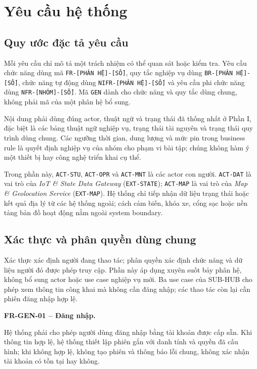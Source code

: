 \clearpage
\section{Yêu cầu hệ thống}

\subsection{Quy ước đặc tả yêu cầu}

Mỗi yêu cầu chỉ mô tả một trách nhiệm có thể quan sát hoặc kiểm tra. Yêu cầu chức năng dùng mã \texttt{FR-[PHÂN HỆ]-[SỐ]}, quy tắc nghiệp vụ dùng \texttt{BR-[PHÂN HỆ]-[SỐ]}, chức năng tự động dùng \texttt{NIFR-[PHÂN HỆ]-[SỐ]} và yêu cầu phi chức năng dùng \texttt{NFR-[NHÓM]-[SỐ]}. Mã \texttt{GEN} dành cho chức năng và quy tắc dùng chung, không phải mã của một phân hệ bổ sung.

Nội dung phải dùng đúng actor, thuật ngữ và trạng thái đã thống nhất ở Phần I, đặc biệt là các bảng thuật ngữ nghiệp vụ, trạng thái tài nguyên và trạng thái quy trình dùng chung. Các ngưỡng thời gian, dung lượng và mức pin trong business rule là quyết định nghiệp vụ của nhóm cho phạm vi bài tập; chúng không hàm ý một thiết bị hay công nghệ triển khai cụ thể.

Trong phần này, \texttt{ACT-STU}, \texttt{ACT-OPR} và \texttt{ACT-MNT} là các actor con người. \texttt{ACT-DAT} là vai trò của \textit{IoT \& State Data Gateway} (\texttt{EXT-STATE}); \texttt{ACT-MAP} là vai trò của \textit{Map \& Geolocation Service} (\texttt{EXT-MAP}). Hệ thống chỉ tiếp nhận dữ liệu trạng thái hoặc kết quả địa lý từ các hệ thống ngoài; cách cảm biến, khóa xe, cổng sạc hoặc nền tảng bản đồ hoạt động nằm ngoài system boundary.

\subsection{Xác thực và phân quyền dùng chung}
\label{sec:common-access}

Xác thực xác định người đang thao tác; phân quyền xác định chức năng và dữ liệu người đó được phép truy cập. Phần này áp dụng xuyên suốt bảy phân hệ, không bổ sung actor hoặc use case nghiệp vụ mới. Ba use case của SUB-HUB cho phép xem thông tin công khai mà không cần đăng nhập; các thao tác còn lại cần phiên đăng nhập hợp lệ.

\noindent\textbf{FR-GEN-01 -- Đăng nhập.}\par
\nopagebreak[4]
Hệ thống phải cho phép người dùng đăng nhập bằng tài khoản được cấp sẵn. Khi thông tin hợp lệ, hệ thống thiết lập phiên gắn với danh tính và quyền đã cấu hình; khi không hợp lệ, không tạo phiên và thông báo lỗi chung, không xác nhận tài khoản có tồn tại hay không.

